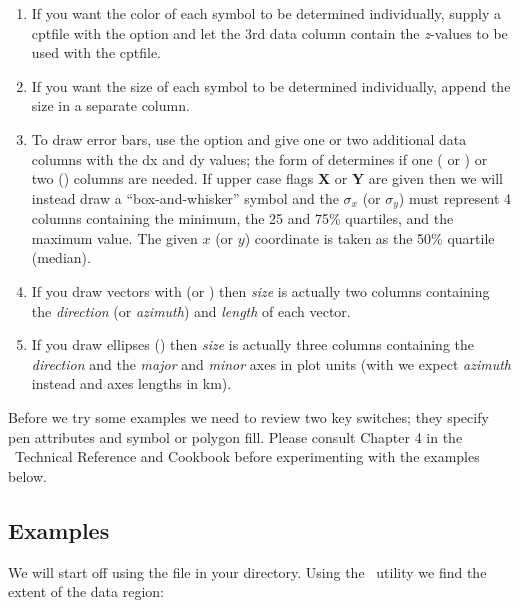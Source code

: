 \documentclass{report}
\begin{document}
\begin{enumerate}

\item If you want the color of each symbol to be determined individually,
supply a cptfile with the  option and let the 3rd data column
contain the {\it z}-values to be used with the cptfile.

\item If you want the size of each symbol to be determined individually,
append the size in a separate column.

\item To draw error bars, use the  option and give one or two
additional data columns with the \PM dx and \PM dy values; the form of
 determines if one ( or ) or two ()
columns are needed.  If upper case flags {\bf X} or {\bf Y} are given then
we will instead draw a ``box-and-whisker'' symbol and the $\sigma_x$ (or
$\sigma_y$) must represent 4 columns containing the minimum, the 25 and 75\%
quartiles, and the maximum value.  The given $x$ (or $y$) coordinate is taken as the 50\%
quartile (median).

\item If you draw vectors with  (or ) then {\it size} is
actually two columns containing the {\it direction} (or {\it azimuth})
and {\it length} of each vector.

\item If you draw ellipses () then {\it size} is actually three
columns containing the {\it direction} and the {\it major} and {\it minor}
axes in plot units (with  we expect {\it azimuth} instead and axes
lengths in km).

\end{enumerate}

Before we try some examples we need to review two key switches; they
specify pen attributes and symbol or polygon fill.  Please consult
Chapter 4 in the \GMT\ Technical Reference and Cookbook before experimenting
with the examples below.

\subsection{Examples}

We will start off using the file  in your directory.
Using the \GMT\ utility  we find the extent of the
data region:
\end{document}
